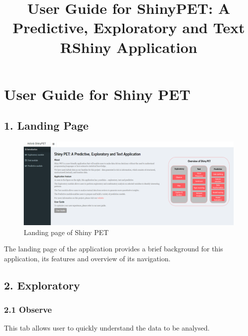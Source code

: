 \documentclass[
  12pt,
]{article}
\title{User Guide for ShinyPET: A Predictive, Exploratory and Text
RShiny Application}
\author{}
\date{\vspace{-2.5em}}
\begin{document}
\maketitle

{
\setcounter{tocdepth}{3}
\tableofcontents
}
\newpage

\hypertarget{user-guide-for-shiny-pet}{%
\section{User Guide for Shiny PET}\label{user-guide-for-shiny-pet}}

\hypertarget{landing-page}{%
\subsection{1. Landing Page}\label{landing-page}}

\begin{figure}[H]

{\centering \includegraphics[width=1\linewidth]{images/landing} 

}

\caption{Landing page of Shiny PET}\label{fig:unnamed-chunk-1}
\end{figure}

The landing page of the application provides a brief background for this
application, its features and overview of its navigation.

\hypertarget{exploratory}{%
\subsection{2. Exploratory}\label{exploratory}}

\hypertarget{observe}{%
\subsubsection{2.1 Observe}\label{observe}}

This tab allows user to quickly understand the data to be analysed.
\end{document}
